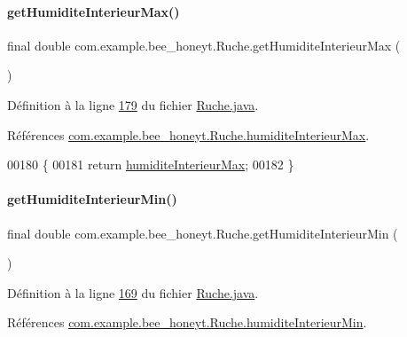 \paragraph{\texorpdfstring{get\+Humidite\+Interieur\+Max()}{getHumiditeInterieurMax()}}
{\footnotesize\ttfamily final double com.\+example.\+bee\+\_\+honeyt.\+Ruche.\+get\+Humidite\+Interieur\+Max (\begin{DoxyParamCaption}{ }\end{DoxyParamCaption})}



Définition à la ligne \hyperlink{_ruche_8java_source_l00179}{179} du fichier \hyperlink{_ruche_8java_source}{Ruche.\+java}.



Références \hyperlink{_ruche_8java_source_l00030}{com.\+example.\+bee\+\_\+honeyt.\+Ruche.\+humidite\+Interieur\+Max}.


\begin{DoxyCode}
00180     \{
00181         \textcolor{keywordflow}{return} \hyperlink{classcom_1_1example_1_1bee__honeyt_1_1_ruche_a1483266a1f1ba7d83e0f69bef8e26231}{humiditeInterieurMax};
00182     \}
\end{DoxyCode}
\mbox{\label{classcom_1_1example_1_1bee__honeyt_1_1_ruche_a4885004ef2c40754789156d83e600b13}} 
\paragraph{\texorpdfstring{get\+Humidite\+Interieur\+Min()}{getHumiditeInterieurMin()}}
{\footnotesize\ttfamily final double com.\+example.\+bee\+\_\+honeyt.\+Ruche.\+get\+Humidite\+Interieur\+Min (\begin{DoxyParamCaption}{ }\end{DoxyParamCaption})}



Définition à la ligne \hyperlink{_ruche_8java_source_l00169}{169} du fichier \hyperlink{_ruche_8java_source}{Ruche.\+java}.



Références \hyperlink{_ruche_8java_source_l00029}{com.\+example.\+bee\+\_\+honeyt.\+Ruche.\+humidite\+Interieur\+Min}.


